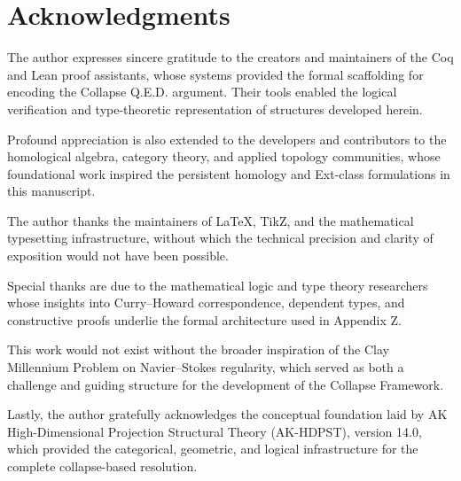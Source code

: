 \documentclass[11pt]{article}
\begin{document}
\section*{Acknowledgments}

The author expresses sincere gratitude to the creators and maintainers of the Coq and Lean proof assistants, whose systems provided the formal scaffolding for encoding the Collapse Q.E.D. argument. Their tools enabled the logical verification and type-theoretic representation of structures developed herein.

Profound appreciation is also extended to the developers and contributors to the homological algebra, category theory, and applied topology communities, whose foundational work inspired the persistent homology and Ext-class formulations in this manuscript.

The author thanks the maintainers of \LaTeX, TikZ, and the mathematical typesetting infrastructure, without which the technical precision and clarity of exposition would not have been possible.

Special thanks are due to the mathematical logic and type theory researchers whose insights into Curry–Howard correspondence, dependent types, and constructive proofs underlie the formal architecture used in Appendix Z.

This work would not exist without the broader inspiration of the Clay Millennium Problem on Navier–Stokes regularity, which served as both a challenge and guiding structure for the development of the Collapse Framework.

Lastly, the author gratefully acknowledges the conceptual foundation laid by AK High-Dimensional Projection Structural Theory (AK-HDPST), version 14.0, which provided the categorical, geometric, and logical infrastructure for the complete collapse-based resolution.
\end{document}
